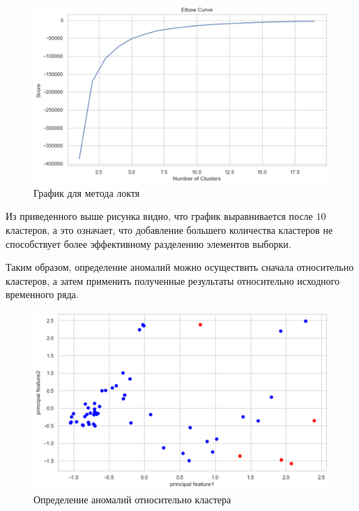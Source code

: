 \documentclass[bachelor, och, referat]{../shiza}
\begin{document}
        \begin{figure}[H]
            \centering
            \includegraphics[width=1\textwidth]{pic/elbow.png}
            \caption{График для метода локтя}
        \end{figure}

        Из приведенного выше рисунка видно, что график выравнивается после $10$
        кластеров, а это означает, что добавление большего количества кластеров
        не способствует более эффективному разделению элементов выборки.

        Таким образом, определение аномалий можно осуществить сначала
        относительно кластеров, а затем применить полученные результаты
        относительно исходного временного ряда.

        \begin{figure}[H]
            \centering
            \includegraphics[width=1\textwidth]{pic/clust1.png}
            \caption{Определение аномалий относительно кластера}
        \end{figure}
\end{document}
